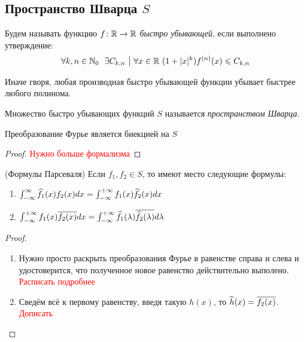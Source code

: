 \subsection{Пространство Шварца $S$}

\begin{definition}
	Будем называть функцию $f \colon \mathbb{R} \to \mathbb{R}$ \textit{быстро убывающей}, если выполнено утверждение:
	\[
		\forall k, n \in \mathbb{N}_0\ \ \exists C_{k, n} \ \big|\  \forall x \in \mathbb{R}\ (1 + |x|^k)f^{(n)}(x) \leqslant C_{k, n}
	\]
\end{definition}

\begin{anote}
	Иначе гворя, любая производная быстро убывающей функции убывает быстрее любого полинома.
\end{anote}

\begin{definition}
	Множество быстро убывающих функций $S$ называется \textit{пространством Шварца}.
\end{definition}

\begin{theorem}
	Преобразование Фурье является биекцией на $S$
\end{theorem}

\begin{proof}
	\textcolor{red}{Нужно больше формализма}
\end{proof}

\begin{theorem} (Формулы Парсеваля)
	Если $f_1, f_2 \in S$, то имеют место следующие формулы:
	\begin{enumerate}
		\item \(\int_{-\infty}^\infty \widehat{f}_1(x)f_2(x)dx = \int_{-\infty}^{+\infty} f_1(x)\widehat{f}_2(x)dx\)
		
		\item \(\int_{-\infty}^{+\infty} f_1(x)\overline{f_2(x)}dx = \int_{-\infty}^{+\infty} \widehat{f}_1(\lambda)\overline{\widehat{f}_2(\lambda)}d\lambda\)
	\end{enumerate}
\end{theorem}

\begin{proof}~
	\begin{enumerate}
		\item Нужно просто раскрыть преобразования Фурье в равенстве справа и слева и удостоверится, что полученное новое равенство действительно выполено. \textcolor{red}{Расписать подробнее}
		
		\item Сведём всё к первому равенству, введя такую $h(x)$, то $\widehat{h}(x) = \overline{f_2(x)}$. \textcolor{red}{Дописать}
	\end{enumerate}
\end{proof}
